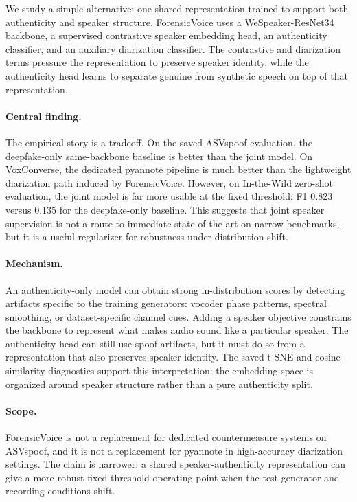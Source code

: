 \documentclass{article}
\newcommand{\fv}{ForensicVoice}
\newcommand{\asv}{ASVspoof}
\newcommand{\itw}{In-the-Wild}
\begin{document}
We study a simple alternative: one shared representation trained to support both
authenticity and speaker structure.  \fv{} uses a WeSpeaker-ResNet34 backbone, a
supervised contrastive speaker embedding head, an authenticity classifier, and
an auxiliary diarization classifier.  The contrastive and diarization terms
pressure the representation to preserve speaker identity, while the authenticity
head learns to separate genuine from synthetic speech on top of that
representation.

\paragraph{Central finding.}
The empirical story is a tradeoff.  On the saved \asv{} evaluation, the
deepfake-only same-backbone baseline is better than the joint model.  On
VoxConverse, the dedicated pyannote pipeline is much better than the lightweight
diarization path induced by \fv{}.  However, on \itw{} zero-shot evaluation, the
joint model is far more usable at the fixed threshold: F1 0.823 versus 0.135
for the deepfake-only baseline.  This suggests that joint speaker supervision
is not a route to immediate state of the art on narrow benchmarks, but it is a
useful regularizer for robustness under distribution shift.

\paragraph{Mechanism.}
An authenticity-only model can obtain strong in-distribution scores by detecting
artifacts specific to the training generators: vocoder phase patterns, spectral
smoothing, or dataset-specific channel cues.  Adding a speaker objective
constrains the backbone to represent what makes audio sound like a particular
speaker.  The authenticity head can still use spoof artifacts, but it must do so
from a representation that also preserves speaker identity.  The saved t-SNE
and cosine-similarity diagnostics support this interpretation: the embedding
space is organized around speaker structure rather than a pure authenticity
split.

\paragraph{Scope.}
\fv{} is not a replacement for dedicated countermeasure systems on \asv{}, and
it is not a replacement for pyannote in high-accuracy diarization settings.  The
claim is narrower: a shared speaker-authenticity representation can give a more
robust fixed-threshold operating point when the test generator and recording
conditions shift.
\end{document}
